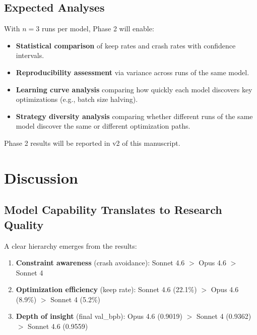 \documentclass[11pt]{article}
\begin{document}
\subsection{Expected Analyses}
\label{sec:phase2_analyses}

With $n=3$ runs per model, Phase 2 will enable:

\begin{itemize}[leftmargin=*]
    \item \textbf{Statistical comparison} of keep rates and crash rates with confidence intervals.
    \item \textbf{Reproducibility assessment} via variance across runs of the same model.
    \item \textbf{Learning curve analysis} comparing how quickly each model discovers key optimizations (e.g., batch size halving).
    \item \textbf{Strategy diversity analysis} comparing whether different runs of the same model discover the same or different optimization paths.
\end{itemize}

Phase 2 results will be reported in v2 of this manuscript.

\section{Discussion}
\label{sec:discussion}

\subsection{Model Capability Translates to Research Quality}
\label{sec:capability}

A clear hierarchy emerges from the results:

\begin{enumerate}[leftmargin=*]
    \item \textbf{Constraint awareness} (crash avoidance): Sonnet 4.6 $>$ Opus 4.6 $>$ Sonnet 4
    \item \textbf{Optimization efficiency} (keep rate): Sonnet 4.6 (22.1\%) $>$ Opus 4.6 (8.9\%) $>$ Sonnet 4 (5.2\%)
    \item \textbf{Depth of insight} (final val\_bpb): Opus 4.6 (0.9019) $>$ Sonnet 4 (0.9362) $>$ Sonnet 4.6 (0.9559)
\end{enumerate}
\end{document}
